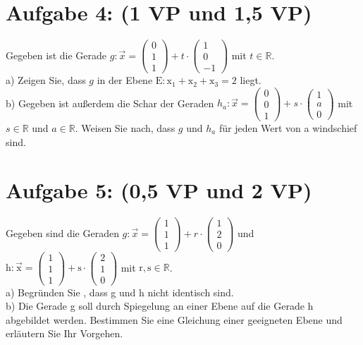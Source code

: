 \documentclass[10pt]{article}
\begin{document}
\section*{Aufgabe 4: (1 VP und 1,5 VP)}
Gegeben ist die Gerade $g: \vec{x}=\left(\begin{array}{l}0 \\ 1 \\ 1\end{array}\right)+t \cdot\left(\begin{array}{c}1 \\ 0 \\ -1\end{array}\right)$ mit $t \in \mathbb{R}$.\\
a) Zeigen Sie, dass $g$ in der Ebene $\mathrm{E}: \mathrm{x}_{1}+\mathrm{x}_{2}+\mathrm{x}_{3}=2$ liegt.\\
b) Gegeben ist außerdem die Schar der Geraden $h_{a}: \vec{x}=\left(\begin{array}{l}0 \\ 0 \\ 1\end{array}\right)+s \cdot\left(\begin{array}{l}1 \\ a \\ 0\end{array}\right)$ mit $s \in \mathbb{R}$ und $a \in \mathbb{R}$. Weisen Sie nach, dass $g$ und $h_{a}$ für jeden Wert von a windschief sind.

\section*{Aufgabe 5: (0,5 VP und 2 VP)}
Gegeben sind die Geraden $g: \vec{x}=\left(\begin{array}{l}1 \\ 1 \\ 1\end{array}\right)+r \cdot\left(\begin{array}{l}1 \\ 2 \\ 0\end{array}\right)$ und $\mathrm{h}: \overrightarrow{\mathrm{x}}=\left(\begin{array}{l}1 \\ 1 \\ 1\end{array}\right)+\mathrm{s} \cdot\left(\begin{array}{l}2 \\ 1 \\ 0\end{array}\right)$ mit $\mathrm{r}, \mathrm{s} \in \mathbb{R}$.\\
a) Begründen Sie , dass g und h nicht identisch sind.\\
b) Die Gerade g soll durch Spiegelung an einer Ebene auf die Gerade h abgebildet werden. Bestimmen Sie eine Gleichung einer geeigneten Ebene und erläutern Sie Ihr Vorgehen.
\end{document}
